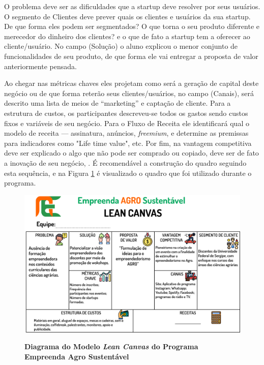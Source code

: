 O problema deve ser as dificuldades que a startup deve resolver por seus usuários. O segmento de Clientes deve prever quais os clientes e usuários da sua startup. De que forma eles podem ser segmentados? O que torna o seu produto diferente e merecedor do dinheiro dos clientes? e o que de fato a startup tem a oferecer ao cliente/usuário. No campo (Solução) o aluno explicou o menor conjunto de funcionalidades de seu produto, de que forma ele vai entregar a proposta de valor anteriormente pensada.

Ao chegar nas métricas chaves eles projetam como será a geração de capital deste negócio ou de que forma reterão seus clientes/usuários, no campo (Canais), será descrito uma lista de meios de “marketing” e captação de cliente. Para a estrutura de custos, os participantes descreveu-se todos os gastos sendo custos fixos e variáveis de seu negócio. Para o Fluxo de Receita ele identificará qual o modelo de receita — assinatura, anúncios, \textit{freemium}, e determine as premissas para indicadores como "Life time value", etc. Por fim, na vantagem competitiva deve ser explicado o algo que não pode ser comprado ou copiado, deve ser de fato a inovação de seu negócio,  \cite{maurya_running_2012, sebrae_aprenda_2019}. É recomendável a construção do quadro seguindo esta sequência, e na Figura \ref{figura_7} é visualizado o quadro que foi utilizado durante o programa.



\begin{figure}[h!]
\centering
\caption{\textbf{Diagrama do Modelo  \textit{Lean Canvas} do Programa Empreenda Agro Sustentável}}
\includegraphics[scale=0.15]{Imagens/canvas.png}
\label{figura_7}
\end{figure}


